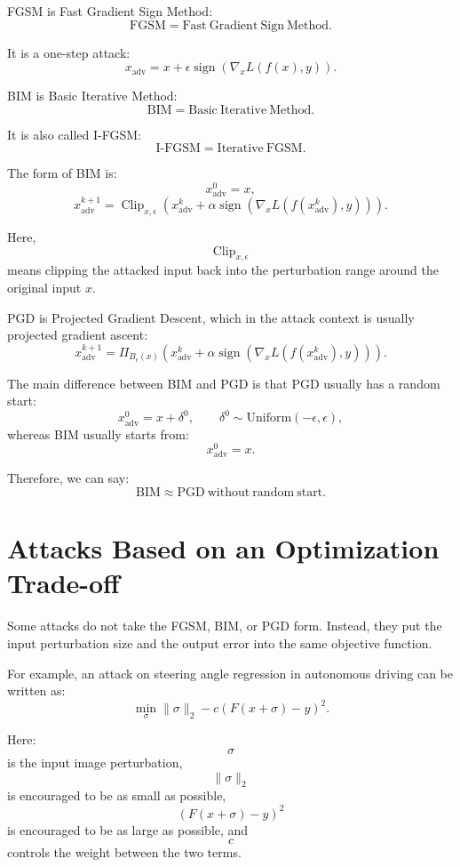 \documentclass{article}
\begin{document}
FGSM is Fast Gradient Sign Method:
\[
\mathrm{FGSM}=\mathrm{Fast\ Gradient\ Sign\ Method}.
\]

It is a one-step attack:
\[
x_{\mathrm{adv}}
=
x+
\epsilon
\operatorname{sign}
\left(
\nabla_x L(f(x),y)
\right).
\]

BIM is Basic Iterative Method:
\[
\mathrm{BIM}=\mathrm{Basic\ Iterative\ Method}.
\]

It is also called I-FGSM:
\[
\mathrm{I\text{-}FGSM}=\mathrm{Iterative\ FGSM}.
\]

The form of BIM is:
\[
x_{\mathrm{adv}}^0=x,
\]
\[
x_{\mathrm{adv}}^{k+1}
=
\operatorname{Clip}_{x,\epsilon}
\left(
x_{\mathrm{adv}}^k
+
\alpha
\operatorname{sign}
\left(
\nabla_x L(f(x_{\mathrm{adv}}^k),y)
\right)
\right).
\]

Here,
\[
\operatorname{Clip}_{x,\epsilon}
\]
means clipping the attacked input back into the perturbation range around the original input \(x\).

PGD is Projected Gradient Descent, which in the attack context is usually projected gradient ascent:
\[
x_{\mathrm{adv}}^{k+1}
=
\Pi_{B_\epsilon(x)}
\left(
x_{\mathrm{adv}}^k
+
\alpha
\operatorname{sign}
\left(
\nabla_x L(f(x_{\mathrm{adv}}^k),y)
\right)
\right).
\]

The main difference between BIM and PGD is that PGD usually has a random start:
\[
x_{\mathrm{adv}}^0=x+\delta^0,
\qquad
\delta^0\sim \mathrm{Uniform}(-\epsilon,\epsilon),
\]
whereas BIM usually starts from:
\[
x_{\mathrm{adv}}^0=x.
\]

Therefore, we can say:
\[
\boxed{
\mathrm{BIM}\approx \mathrm{PGD\ without\ random\ start}.
}
\]

\section{Attacks Based on an Optimization Trade-off}

Some attacks do not take the FGSM, BIM, or PGD form. Instead, they put the input perturbation size and the output error into the same objective function.

For example, an attack on steering angle regression in autonomous driving can be written as:
\[
\min_{\sigma}
\|\sigma\|_2
-
c\left(F(x+\sigma)-y\right)^2.
\]

Here:
\[
\sigma
\]
is the input image perturbation,
\[
\|\sigma\|_2
\]
is encouraged to be as small as possible,
\[
\left(F(x+\sigma)-y\right)^2
\]
is encouraged to be as large as possible, and
\[
c
\]
controls the weight between the two terms.
\end{document}
